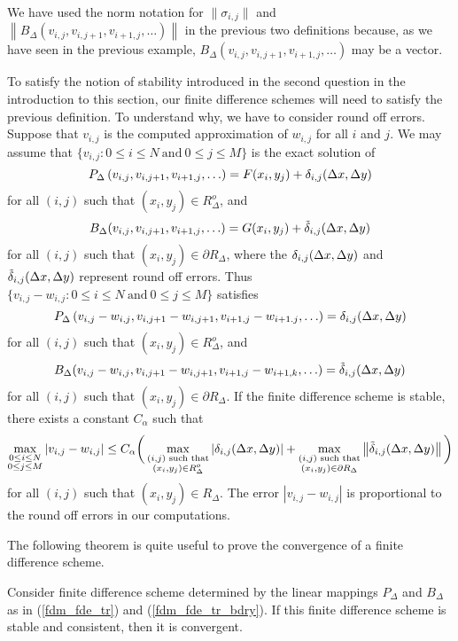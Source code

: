 We have used the norm notation for $\|\sigma_{i,j}\|$ and
$\left\| B_\Delta(v_{i,j},v_{i,j+1},v_{i+1,j}, \ldots) \right\|$
in the previous two definitions because, as we have seen in the previous
example, $B_\Delta(v_{i,j},v_{i,j+1},v_{i+1,j}, \ldots)$ may
be a vector.

To satisfy the notion of stability introduced in the second question
in the introduction to this section, our finite difference schemes
will need to satisfy the previous definition.  To understand why, we
have to consider round off errors.  Suppose that $v_{i,j}$ is the
computed approximation of $w_{i,j}$ for all $i$ and $j$.  We may
assume that
$\{ v_{i,j} : 0 \leq i \leq N \ \text{and} \ 0 \leq j \leq M \}$ is
the exact solution of
\[
P_\Delta\left(v_{i,j}, v_{i,j+1}, v_{i+1,j}, \ldots\right)
= F(x_i,y_j) + \delta_{i,j}(\Delta{x},\Delta{y})
\]
for all $(i,j)$ such that $(x_i,y_j) \in R^o_\Delta$, and
\[
B_\Delta(v_{i,j},v_{i,j+1},v_{i+1,j}, \ldots)
= G(x_i,y_j) + \tilde{\delta}_{i,j}(\Delta{x},\Delta{y})
\]
for all $(i,j)$ such that $(x_i,y_j) \in \partial R_\Delta$, where
the $\delta_{i,j}(\Delta{x},\Delta{y})$ and
$\tilde{\delta}_{i,j}(\Delta{x},\Delta{y})$ represent round off errors.
Thus
$\{ v_{i,j} - w_{i,j}: 0 \leq i \leq N \ \text{and} \ 0 \leq j \leq M \}$
satisfies
\[
P_\Delta\left(v_{i,j}-w_{i,j}, v_{i,j+1}-w_{i,j+1},
v_{i+1,j}-w_{i+1.j}, \ldots\right)
= \delta_{i,j}(\Delta{x},\Delta{y})
\]
for all $(i,j)$ such that $(x_i,y_j) \in R^o_\Delta$, and
\[
B_\Delta(v_{i,j}-w_{i,j},v_{i,j+1}-w_{i,j+1},v_{i+1,j}-w_{i+1,k}, \ldots)
= \tilde{\delta}_{i,j}(\Delta{x},\Delta{y})
\]
for all $(i,j)$ such that $(x_i,y_j) \in \partial R_\Delta$.  If the
finite difference scheme is stable, there exists a constant $C_\alpha$ such
that
\[
\max_{\substack{0\leq i\leq N\\0\leq j \leq M}} |v_{i,j}-w_{i,j}|
\leq C_\alpha \bigg(
\max_{\substack{(i,j) \text{ such that}\\(x_i,y_j)\in R^o_\Delta}}
\left| \delta_{i,j}(\Delta{x},\Delta{y}) \right|
+ \max_{\substack{(i,j) \text{ such that}\\ (x_i,y_j)\in \partial R_\Delta}}
\left\| \tilde{\delta}_{i,j}(\Delta{x},\Delta{y}) \right\|
\bigg)
\]
for all $(i,j)$ such that $(x_i,y_j) \in R_\Delta$.  The error
$|v_{i,j} - w_{i,j}|$ is proportional to the round off errors in our
computations.

The following theorem is quite useful to prove the convergence of a finite
difference scheme.

\begin{theorem} \label{StabConstConv}
Consider finite difference scheme determined by the linear mappings
$P_\Delta$ and $B_\Delta$ as in (\ref{fdm_fde_tr}) and
(\ref{fdm_fde_tr_bdry}).  If this finite difference scheme is stable
and consistent, then it is convergent.
\end{theorem}

